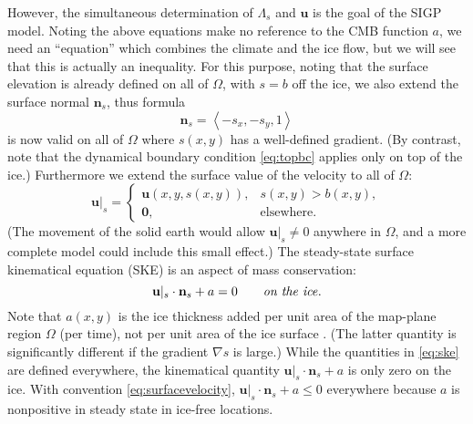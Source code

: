 \documentclass[letterpaper,final,12pt,reqno]{amsart}
\theoremstyle{claim}
\newcommand{\grad}{\nabla}
\newcommand{\bn}{\mathbf{n}}
\newcommand{\bu}{\mathbf{u}}
\newcommand{\bzero}{\bm{0}}
\numberwithin{equation}{section}
\numberwithin{figure}{section}
\numberwithin{table}{section}
\numberwithin{theorem}{section}
\begin{document}
\newcommand{\bus}{\bu|_s}

However, the simultaneous determination of $\Lambda_s$ and $\bu$ is the goal of the SIGP model.  Noting the above equations make no reference to the CMB function $a$, we need an ``equation'' which combines the climate and the ice flow, but we will see that this is actually an inequality.  For this purpose, noting that the surface elevation is already defined on all of $\Omega$, with $s=b$ off the ice, we also extend the surface normal $\bn_s$, thus formula
\begin{equation}
\bn_s = \left<-s_x,-s_y,1\right> \label{eq:surfacenormal}
\end{equation}
is now valid on all of $\Omega$ where $s(x,y)$ has a well-defined gradient.  (By contrast, note that the dynamical boundary condition \eqref{eq:topbc} applies only on top of the ice.)  Furthermore we extend the surface value of the velocity to all of $\Omega$:
\begin{equation}
\bus = \begin{cases} \bu(x,y,s(x,y)), & s(x,y) > b(x,y), \\
                     \bzero, & \text{elsewhere}. \end{cases} \label{eq:surfacevelocity}
\end{equation}
(The movement of the solid earth would allow $\bus\ne 0$ anywhere in $\Omega$, and a more complete model could include this small effect.)  The steady-state surface kinematical equation (SKE) \cite[see equation (5.21)]{GreveBlatter2009} is an aspect of mass conservation:
\begin{equation}
\bus \cdot \bn_s + a = 0 \qquad \text{\emph{on the ice}}. \label{eq:ske}
\end{equation}
Note that $a(x,y)$ is the ice thickness added per unit area of the map-plane region $\Omega$ (per time), not per unit area of the ice surface \cite[compare]{GreveBlatter2009}.  (The latter quantity is significantly different if the gradient $\grad s$ is large.)  While the quantities in \eqref{eq:ske} are defined everywhere, the kinematical quantity $\bus \cdot \bn_s + a$ is only zero on the ice.  With convention \eqref{eq:surfacevelocity}, $\bus \cdot \bn_s + a \le 0$ everywhere because $a$ is nonpositive in steady state in ice-free locations.
\end{document}
